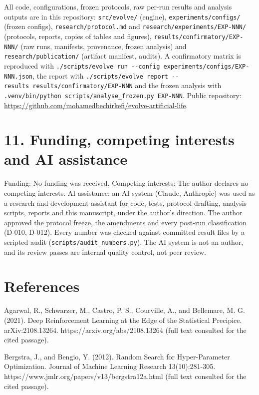 \documentclass[
]{article}
\begin{document}
All code, configurations, frozen protocols, raw per-run results and
analysis outputs are in this repository: \texttt{src/evolve/} (engine),
\texttt{experiments/configs/} (frozen configs),
\texttt{research/protocol.md} and \texttt{research/experiments/EXP-NNN/}
(protocols, reports, copies of tables and figures),
\texttt{results/confirmatory/EXP-NNN/} (raw runs, manifests, provenance,
frozen analysis) and \texttt{research/publication/} (artifact manifest,
audits). A confirmatory matrix is reproduced with
\texttt{./scripts/evolve\ run\ -\/-config\ experiments/configs/EXP-NNN.json},
the report with
\texttt{./scripts/evolve\ report\ -\/-results\ results/confirmatory/EXP-NNN}
and the frozen analysis with
\texttt{.venv/bin/python\ scripts/analyse\_frozen.py\ EXP-NNN}. Public
repository:
\url{https://github.com/mohamedbechirkefi/evolve-artificial-life}.

\section{11. Funding, competing interests and AI
assistance}\label{funding-competing-interests-and-ai-assistance}

Funding: No funding was received. Competing interests: The author
declares no competing interests. AI assistance: an AI system (Claude,
Anthropic) was used as a research and development assistant for code,
tests, protocol drafting, analysis scripts, reports and this manuscript,
under the author's direction. The author approved the protocol freeze,
the amendments and every post-run classification (D-010, D-012). Every
number was checked against committed result files by a scripted audit
(\texttt{scripts/audit\_numbers.py}). The AI system is not an author,
and its review passes are internal quality control, not peer review.

\section{References}\label{references}

Agarwal, R., Schwarzer, M., Castro, P. S., Courville, A., and Bellemare,
M. G. (2021). Deep Reinforcement Learning at the Edge of the Statistical
Precipice. arXiv:2108.13264. https://arxiv.org/abs/2108.13264 (full text
consulted for the cited passage).

Bergstra, J., and Bengio, Y. (2012). Random Search for Hyper-Parameter
Optimization. Journal of Machine Learning Research 13(10):281-305.
https://www.jmlr.org/papers/v13/bergstra12a.html (full text consulted
for the cited passage).
\end{document}
